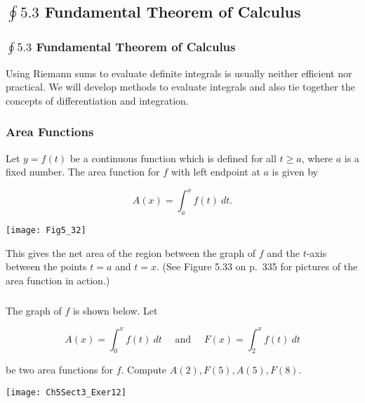 \documentclass[14pt]{beamer}
\newcommand{\dint}{\displaystyle\int}
\begin{document}
\begin{frame}
\subsection[$\oint 5.3$ Fundamental Theorem of Calculus]{$\oint 5.3$ Fundamental Theorem of Calculus}
\frametitle{$\oint 5.3$ Fundamental Theorem of Calculus}
\small
Using Riemann sums to evaluate definite integrals is usually neither efficient nor practical.  We will develop methods to evaluate integrals and also tie together the concepts of differentiation and integration.  
\end{frame}

\begin{frame}
\frametitle{\small Area Functions}
\footnotesize
Let $y=f(t)$ be a continuous function which is defined for all $t \ge a$, where $a$ is a fixed number.  The area function for $f$ with left endpoint at $a$ is given by 

\vspace{-1.5pc}
\[A(x)=\dint_a^x f(t)\ dt.\]  

\vspace{-1.8pc}
\begin{center}
\texttt{[image: Fig5\_32]}
\end{center}

\vspace{-1.5pc}
This gives the net area of the region between the graph of $f$ and the $t$-axis between the points $t=a$ and $t=x$.  (See Figure 5.33 on p.\ 335 for pictures of the area function in action.) 
\end{frame}

\begin{frame}
\frametitle{}
\footnotesize
\begin{exe} The graph of $f$ is shown below.  Let 

\vspace{-0.75pc}
\[A(x)=\dint_0^x f(t)\ dt\quad\text{ and }\quad F(x)=\dint_2^x f(t)\ dt\] 

\vspace{-0.25pc}
be two area functions for $f$.  Compute $A(2), F(5), A(5), F(8)$.

\vspace{-0.65pc}
\begin{center}
\texttt{[image: Ch5Sect3\_Exer12]}
\end{center}
\end{exe}
\end{frame}
\end{document}
